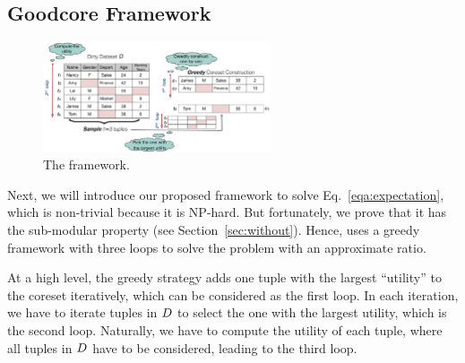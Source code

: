 
\fi



\subsection{Goodcore Framework}
\label{subsec:framework} 

\begin{figure}
	\centering
	\includegraphics[width=0.6\textwidth]{figs/Overview}
	\caption{The \ours framework.}
	\label{fig:overview}
\end{figure}


Next, we will introduce our proposed \ours framework   to solve  Eq.~\ref{eqa:expectation}, which  is non-trivial because it  is NP-hard.
But fortunately, we prove that it has the sub-modular property (see Section~\ref{sec:without}). Hence, \ours uses a greedy framework with three loops to solve the problem with an approximate ratio. 

At a high level, the greedy strategy adds one tuple with the largest ``utility'' to the coreset iteratively, which can be considered as the first loop. In each iteration, we have to iterate tuples in $D$ to select the one with the largest utility, which is the second loop. Naturally, we have to compute the utility of each tuple, where all tuples in  $D$ have to be considered, leading to the third loop.
 

